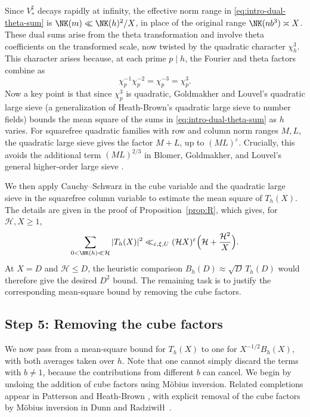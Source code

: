 Since $V_*^\sharp$ decays rapidly at infinity, the effective norm range in \eqref{eq:intro-dual-theta-sum} is $\NK(m)\ll\NK(h)^2/X$, in place of the original range $\NK(nb^3)\asymp X$. These dual sums arise from the theta transformation and involve theta coefficients on the transformed scale, now twisted by the quadratic character $\chi_h^3$. This character arises because, at each prime $p\mid h$, the Fourier and theta factors combine as
\begin{equation}\label{eq:intro-quadratic-twist}
 \chi_p^{-1}\chi_p^{-2}=\chi_p^{-3}=\chi_p^3.
\end{equation}
Now a key point is that since $\chi_p^3$ is quadratic, Goldmakher and Louvel's quadratic large sieve \cite[Theorem~1.1 and Corollary~1.2]{GL} (a generalization of Heath-Brown's quadratic large sieve \cite{HB95} to number fields) bounds the mean square of the sums in \eqref{eq:intro-dual-theta-sum} as $h$ varies. For squarefree quadratic families with row and column norm ranges $M,L$, the quadratic large sieve gives the factor $M+L$, up to $(ML)^\varepsilon$. Crucially, this avoids the additional term $(ML)^{2/3}$ in Blomer, Goldmakher, and Louvel's general higher-order large sieve \cite[Theorem~1.3]{BGL}.

We then apply Cauchy--Schwarz in the cube variable and the quadratic
large sieve in the squarefree column variable to estimate the mean square of $T_h(X)$. The details are given in the proof of Proposition~\ref{prop:R}, which gives, for $\mathcal H,X\ge1$,
\begin{equation}\label{eq:intro-completed-ms}
 \sum_{0<\NK(h)\ll\mathcal H}|T_h(X)|^2
 \ll_{\varepsilon,\xi,U}(\mathcal H X)^\varepsilon
       \Bigl(\mathcal H+\frac{\mathcal H^2}{X}\Bigr).
\end{equation}
At $X=D$ and $\mathcal H\le D$, the heuristic comparison
$B_h(D)\approx\sqrt D\,T_h(D)$ would therefore give the desired
$D^2$ bound. The remaining task is to justify the corresponding
mean-square bound by removing the cube factors.

\subsection{Step 5: Removing the cube factors} 
We now pass from a mean-square bound for $T_h(X)$ to one for $X^{-1/2}B_h(X)$, with both averages taken over $h$. Note that one cannot simply discard the terms with $b\ne1$, because the contributions from different $b$ can cancel. We begin by undoing the addition of cube factors using M\"obius inversion. Related completions appear in Patterson \cite[Theorem~6.1]{Pat77} and Heath-Brown \cite[\S3]{HB00}, with explicit removal of the cube factors by M\"obius inversion in Dunn and Radziwi\l\l\ \cite[Proposition~5.3 and (8.2)]{DR}.

